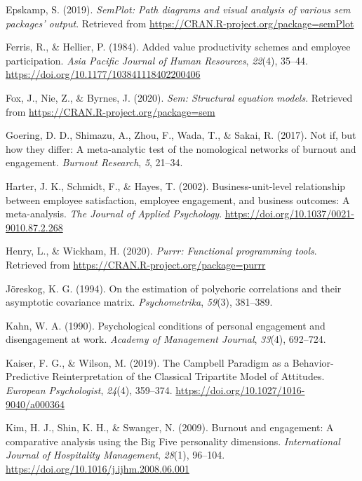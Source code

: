 \documentclass[
  english,
  man]{apa6}
\begin{document}
\leavevmode\hypertarget{ref-R-semPlot}{}%
Epskamp, S. (2019). \emph{SemPlot: Path diagrams and visual analysis of various sem packages' output}. Retrieved from \url{https://CRAN.R-project.org/package=semPlot}

\leavevmode\hypertarget{ref-ferris_added_1984}{}%
Ferris, R., \& Hellier, P. (1984). Added value productivity schemes and employee participation. \emph{Asia Pacific Journal of Human Resources}, \emph{22}(4), 35--44. \url{https://doi.org/10.1177/103841118402200406}

\leavevmode\hypertarget{ref-R-sem}{}%
Fox, J., Nie, Z., \& Byrnes, J. (2020). \emph{Sem: Structural equation models}. Retrieved from \url{https://CRAN.R-project.org/package=sem}

\leavevmode\hypertarget{ref-goering2017not}{}%
Goering, D. D., Shimazu, A., Zhou, F., Wada, T., \& Sakai, R. (2017). Not if, but how they differ: A meta-analytic test of the nomological networks of burnout and engagement. \emph{Burnout Research}, \emph{5}, 21--34.

\leavevmode\hypertarget{ref-harter_business-unit-level_2002}{}%
Harter, J. K., Schmidt, F., \& Hayes, T. (2002). Business-unit-level relationship between employee satisfaction, employee engagement, and business outcomes: A meta-analysis. \emph{The Journal of Applied Psychology}. \url{https://doi.org/10.1037/0021-9010.87.2.268}

\leavevmode\hypertarget{ref-R-purrr}{}%
Henry, L., \& Wickham, H. (2020). \emph{Purrr: Functional programming tools}. Retrieved from \url{https://CRAN.R-project.org/package=purrr}

\leavevmode\hypertarget{ref-joreskog1994estimation}{}%
Jöreskog, K. G. (1994). On the estimation of polychoric correlations and their asymptotic covariance matrix. \emph{Psychometrika}, \emph{59}(3), 381--389.

\leavevmode\hypertarget{ref-kahn_psychological_1990}{}%
Kahn, W. A. (1990). Psychological conditions of personal engagement and disengagement at work. \emph{Academy of Management Journal}, \emph{33}(4), 692--724.

\leavevmode\hypertarget{ref-kaiser_campbell_2019}{}%
Kaiser, F. G., \& Wilson, M. (2019). The Campbell Paradigm as a Behavior-Predictive Reinterpretation of the Classical Tripartite Model of Attitudes. \emph{European Psychologist}, \emph{24}(4), 359--374. \url{https://doi.org/10.1027/1016-9040/a000364}

\leavevmode\hypertarget{ref-kim_burnout_2009}{}%
Kim, H. J., Shin, K. H., \& Swanger, N. (2009). Burnout and engagement: A comparative analysis using the Big Five personality dimensions. \emph{International Journal of Hospitality Management}, \emph{28}(1), 96--104. \url{https://doi.org/10.1016/j.ijhm.2008.06.001}
\end{document}
